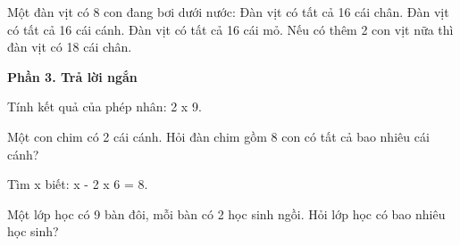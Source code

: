\begin{ex} %
Một đàn vịt có 8 con đang bơi dưới nước:
\choiceTF
{\True Đàn vịt có tất cả 16 cái chân.}
{\True Đàn vịt có tất cả 16 cái cánh.}
{Đàn vịt có tất cả 16 cái mỏ.}
{Nếu có thêm 2 con vịt nữa thì đàn vịt có 18 cái chân.}
\end{ex}

\textbf{Phần 3. Trả lời ngắn}

\begin{ex} %
Tính kết quả của phép nhân: 2 x 9.
\end{ex}

\begin{ex} %
Một con chim có 2 cái cánh. Hỏi đàn chim gồm 8 con có tất cả bao nhiêu cái cánh?
\end{ex}

\begin{ex} %
Tìm x biết: x - 2 x 6 = 8.
\end{ex}

\begin{ex} %
Một lớp học có 9 bàn đôi, mỗi bàn có 2 học sinh ngồi. Hỏi lớp học có bao nhiêu học sinh?
\end{ex}

